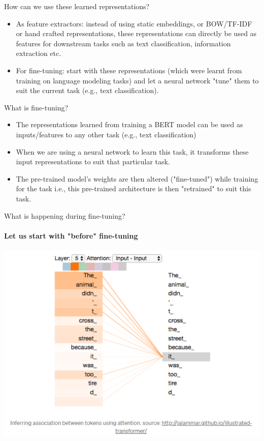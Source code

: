 \documentclass{beamer}
\begin{document}
\begin{frame}{How can we use these learned representations?}
    \begin{itemize}
        \item As feature extractors: instead of using static embeddings, or BOW/TF-IDF or hand crafted representations, these representations can directly be used as features for downstream tasks such as text classification, information extraction etc. \pause
        \item For fine-tuning: start with these representations (which were learnt from training on language modeling tasks) and let a neural network "tune" them to suit the current task (e.g., text classification). 
    \end{itemize}
\end{frame}

\begin{frame}{What is fine-tuning?}
\begin{itemize}
    \item The representations learned from training a BERT model can be used as inputs/features to any other task (e.g., text classification)
    \item When we are using a neural network to learn this task, it transforms these input representations to suit that particular task. 
    \item The pre-trained model's weights are then altered ("fine-tuned") while training for the task i.e., this pre-trained architecture is then "retrained" to suit this task. 
\end{itemize}\end{frame}

\begin{frame}{What is happening during fine-tuning?}
\framesubtitle{Let us start with "before" fine-tuning}
\includegraphics[width=\textwidth]{figures/attention.png}
\end{frame}
\end{document}
